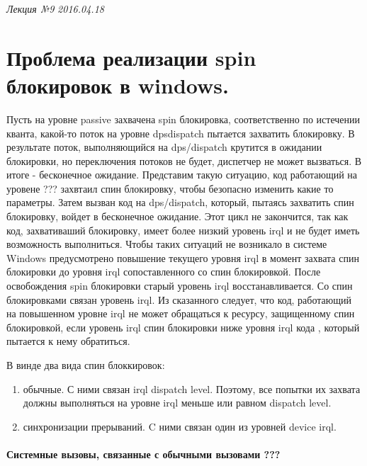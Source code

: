 \clearpage
\begin{flushright}
	\textit{Лекция №9}
	\textit{2016.04.18}
\end{flushright}

\section{Проблема реализации spin блокировок в windows.}

Пусть на уровне passive захвачена spin блокировка, соответственно по истечении кванта, какой-то поток на уровне dpsdispatch пытается захватить блокировку. В результате поток, выполняющийся на  dps/dispatch крутится  в ожидании блокировки, но переключения потоков не будет, диспетчер не может вызваться. В итоге - бесконечное ожидание.
Представим такую ситуацию, код работающий на уровене ??? захвтаил спин блокировку, чтобы безопасно изменить какие то параметры. Затем вызван код на dps/dispatch, который, пытаясь захватить спин блокировку, войдет в бесконечное ожидание. Этот цикл не закончится, так как код, захвативаший блокировку, имеет более низкий уровень irql и не будет иметь возможность выполниться.
Чтобы таких ситуаций не возникало в системе Windows предусмотрено повышение текущего уровня irql в момент захвата спин блокировки до уровня irql сопоставленного  со спин блокировкой. После освобождения spin блокировки старый уровень irql восстанавливается. Со спин блокировками связан уровень irql. Из сказанного следует, что код, работающий на повышенном уровне irql не может обращаться к ресурсу, защищенному спин блокировкой, если уровень irql спин блокировки ниже уровня irql кода , который пытается к нему обратиться.

В винде два вида спин блоккировок:
\begin{enumerate}
	\item обычные. С ними связан irql dispatch level. Поэтому, все попытки их захвата должны выполняться на уровне irql меньше или равном dispatch level.
	\item синхронизации прерываний. C ними связан один из уровней device irql.
\end{enumerate}	

\paragraph{Системные вызовы, связанные с обычными вызовами ???}

